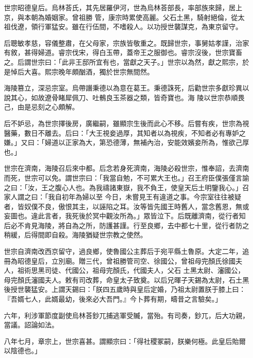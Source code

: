\begin{pinyinscope}
 世宗昭德皇后。烏林荅氏，其先居羅伊河，世為烏林荅部長，率部族來歸，居上京，與本朝為婚姻家。曾祖勝
 管，康宗時累使高麗。父石土黑，騎射絕倫，從太祖伐遼，領行軍猛安。雖在行伍間，不嗜殺人。以功授世襲謀克，為東京留守。



 后聰敏孝慈，容儀整肅，在父母家，宗族皆敬重之。既歸世宗，事舅姑孝謹，治家有敘，甚得婦道。睿宗伐宋，得白玉帶，蓋帝王之服御也。睿宗沒後，世宗寶畜之。后謂世宗曰：「此非王邸所宜有也，當獻之天子。」世宗以為然，獻之熙宗，於是悼后大喜。熙宗晚年頗酗酒，獨於世宗無間然。



 海陵篡立，深忌宗室。烏帶譖秉德以為意在葛王。秉德誅死，后勸世宗多獻珍異以說其心，如故遼骨睹犀佩刀、吐鶻良玉茶器之類，皆奇寶也。海
 陵以世宗恭順畏己，由是忌刻之心頗解。



 后不妒忌，為世宗擇後房，廣繼嗣，雖顯宗生後而此心不移。后嘗有疾，世宗為視醫藥，數日不離去。后曰：「大王視妾過厚，其知者以為視疾，不知者必有專妒之嫌。」又曰：「婦道以正家為大，第恐德薄，無補內治，安能效嬪妾所為，惟欲己厚也。」



 世宗在濟南，海陵召后來中都。后念若身死濟南，海陵必殺世宗，惟奉詔，去濟南而死，世宗可以免。謂世宗曰：「我當自勉，不可累大王也。」召王府臣僕張僅言諭之曰：「汝，王之腹心人也。為我禱諸東嶽，我不負王，使皇天后土明鑒我心。」召家人謂之曰：「我自初年為婦以至
 今日，未嘗見王有違道之事。今宗室往往被疑者，皆奴僕不良，傲恨其主，以誣陷之耳。汝等皆先國王時舊人，當念舊恩，無或妄圖也。違此言者，我死後於冥中觀汝所為。」眾皆泣下。后既離濟南，從行者知后必不肯見海陵，將自為之所，防護甚謹。行至良鄉，去中都七十里，從行者防之稍緩，后得間即自殺。海陵猶疑世宗教之使然。



 世宗自濟南改西京留守，過良鄉，使魯國公主葬后于宛平縣土魯原。大定二年，追冊為昭德皇后，立別廟。贈三代，曾祖勝管司空、徐國公，曾祖母完顏氏徐國夫人，祖術思黑司徒、代國公，祖母完顏氏，代國夫人，父石
 土黑太尉、瀋國公，母完顏氏瀋國夫人。敕有司改葬，命皇太子致奠。以后兄暉子天錫為太尉，石土黑後授世襲猛安。上謂天錫曰：「朕四五歲時與皇后定婚，乃祖太尉置朕于膝上曰：『吾婿七人，此婿最幼，後來必大吾門。』今卜葬有期，疇昔之言驗矣。」



 六年，利涉軍節度副使烏林荅鈔兀捕逃軍受贓，當殆。有司奏，鈔兀，后大功親，當議。詔論如法。



 八年七月，章宗上，世宗喜甚。謂顯宗曰：「得社稷冢嗣，朕樂何極。此皇后貽爾以陰德也。」




\end{pinyinscope}
